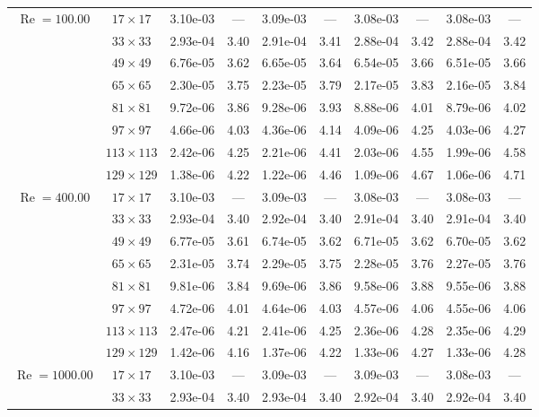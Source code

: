 \documentclass[preprint, 12pt]{elsarticle}
\begin{document}
{\begin{center}
\begin{table}[H]
{\begin{tabular*}{\textwidth}{@{\extracolsep\fill}cccccccccc@{}}
    \hline
    \multirow{7}{*}{$\operatorname{Re}=100.00$} & $17\times 17$ & 3.10e-03 & --- & 3.09e-03 & --- & 3.08e-03 & --- & 3.08e-03 & --- \\
& $33\times 33$ & 2.93e-04 & 3.40 & 2.91e-04 & 3.41 & 2.88e-04 & 3.42 & 2.88e-04 & 3.42 \\
& $49\times 49$ & 6.76e-05 & 3.62 & 6.65e-05 & 3.64 & 6.54e-05 & 3.66 & 6.51e-05 & 3.66 \\
\multirow{3}{*}{$\operatorname{Wi}=5$} & $65\times 65$ & 2.30e-05 & 3.75 & 2.23e-05 & 3.79 & 2.17e-05 & 3.83 & 2.16e-05 & 3.84 \\
& $81\times 81$ & 9.72e-06 & 3.86 & 9.28e-06 & 3.93 & 8.88e-06 & 4.01 & 8.79e-06 & 4.02 \\
& $97\times 97$ & 4.66e-06 & 4.03 & 4.36e-06 & 4.14 & 4.09e-06 & 4.25 & 4.03e-06 & 4.27 \\
& $113\times 113$ & 2.42e-06 & 4.25 & 2.21e-06 & 4.41 & 2.03e-06 & 4.55 & 1.99e-06 & 4.58 \\
& $129\times 129$ & 1.38e-06 & 4.22 & 1.22e-06 & 4.46 & 1.09e-06 & 4.67 & 1.06e-06 & 4.71 \\
    \hline
    \multirow{7}{*}{$\operatorname{Re}=400.00$} & $17\times 17$ & 3.10e-03 & --- & 3.09e-03 & --- & 3.08e-03 & --- & 3.08e-03 & --- \\
& $33\times 33$ & 2.93e-04 & 3.40 & 2.92e-04 & 3.40 & 2.91e-04 & 3.40 & 2.91e-04 & 3.40 \\
& $49\times 49$ & 6.77e-05 & 3.61 & 6.74e-05 & 3.62 & 6.71e-05 & 3.62 & 6.70e-05 & 3.62 \\
\multirow{3}{*}{$\operatorname{Wi}=5$} & $65\times 65$ & 2.31e-05 & 3.74 & 2.29e-05 & 3.75 & 2.28e-05 & 3.76 & 2.27e-05 & 3.76 \\
& $81\times 81$ & 9.81e-06 & 3.84 & 9.69e-06 & 3.86 & 9.58e-06 & 3.88 & 9.55e-06 & 3.88 \\
& $97\times 97$ & 4.72e-06 & 4.01 & 4.64e-06 & 4.03 & 4.57e-06 & 4.06 & 4.55e-06 & 4.06 \\
& $113\times 113$ & 2.47e-06 & 4.21 & 2.41e-06 & 4.25 & 2.36e-06 & 4.28 & 2.35e-06 & 4.29 \\
& $129\times 129$ & 1.42e-06 & 4.16 & 1.37e-06 & 4.22 & 1.33e-06 & 4.27 & 1.33e-06 & 4.28 \\
    \hline
    \multirow{7}{*}{$\operatorname{Re}=1000.00$} & $17\times 17$ & 3.10e-03 & --- & 3.09e-03 & --- & 3.09e-03 & --- & 3.08e-03 & --- \\
& $33\times 33$ & 2.93e-04 & 3.40 & 2.93e-04 & 3.40 & 2.92e-04 & 3.40 & 2.92e-04 & 3.40 \\

\end{tabular*}}
\end{table}
\end{center}}
\end{document}
